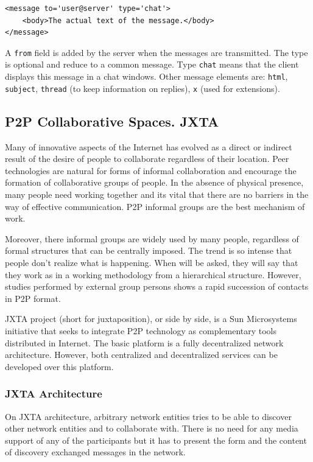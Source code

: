 \begin{verbatim}
<message to='user@server' type='chat'>
    <body>The actual text of the message.</body>
</message>
\end{verbatim}

A \texttt{from} field is added by the server when the messages are
transmitted. The type is optional and reduce to a common message. Type
\texttt{chat} means that the client displays this message in a chat windows.
Other message elements are: \texttt{html}, \texttt{subject}, \texttt{thread}
(to keep information on replies), \texttt{x} (used for extensions).

\subsection{P2P Collaborative Spaces. JXTA}

Many of innovative aspects of the Internet has evolved as a direct or indirect
result of the desire of people to collaborate regardless of their location.
Peer technologies are natural for forms of informal collaboration and encourage
the formation of collaborative groups of people. In the absence of physical
presence, many people need working together and its vital that there are no
barriers in the way of effective communication. P2P informal groups are the
best mechanism of work.

Moreover, there informal groups are widely used by many people, regardless of
formal structures that can be centrally imposed. The trend is so intense that
people don't realize what is happening. When will be asked, they will say that
they work as in a working methodology from a hierarchical structure. However,
studies performed by external group persons shows a rapid succession of contacts
in P2P format.

JXTA project (short for juxtaposition), or side by side, is a Sun Microsystems
initiative that seeks to integrate P2P technology as complementary tools
distributed in Internet. The basic platform is a fully decentralized network
architecture. However, both centralized and decentralized services can be
developed over this platform.

\subsubsection{JXTA Architecture}

On JXTA architecture, arbitrary network entities tries to be able to discover
other network entities and to collaborate with. There is no need for any media
support of any of the participants but it has to present the form and the
content of discovery exchanged messages in the network.

